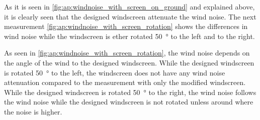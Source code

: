 As it is seen in \autoref{fig:ap:windnoise_with_screen_on_ground} and explained above, it is clearly seen that the designed windscreen attenuate the wind noise. The next measurement \autoref{fig:ap:windnoise_with_screen_rotation} shows the differences in wind noise while the windscreen is ether rotated \SI{50}{\degree} to the left and to the right.  

As seen in \autoref{fig:ap:windnoise_with_screen_rotation}, the wind noise depends on the angle of the wind to the designed windscreen. While the designed windscreen is rotated \SI{50}{\degree} to the left, the windscreen does not have any wind noise attenuation compared to the measurement with only the modified windscreen. While the designed windscreen is rotated \SI{50}{\degree} to the right, the wind noise follows the wind noise while the designed windscreen is not rotated unless around  where the noise is  higher.   






